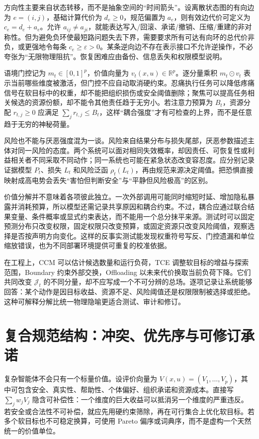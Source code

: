 方向性主要来自状态转移，而不是抽象空间的“时间箭头”。设离散状态图的有向边为 $e=(i,j)$，基础计算代价为 $d_e\geq0$，规范偏置为 $a_e$，则有效边代价可定义为 $c_e=d_e+a_e$。允许 $a_{ij}\neq a_{ji}$，就能表达写入/回滚、承诺/撤销、压缩/重建的非对称性。但为避免负环使最短路问题失去下界，需要要求所有可达有向环的总代价非负，或更强地令每条 $c_e\geq\varepsilon>0$。某条逆向边不存在表示接口不允许逆操作，不必夸张为“无限物理阻抗”。恢复困难应由备份、信息丢失和权限模型说明。

语境门控记为 $m_t\in[0,1]^p$，价值向量为 $v_t(x,u)\in\mathbb R^p$。逐分量乘积 $m_t\odot v_t$ 表示当前哪些维度被激活，但门控不应自动取消硬约束。忍痛执行任务可以降低疼痛信号在软目标中的权重，却不能把组织损伤或安全阈值删除；聚焦可以提高任务相关候选的资源份额，却不能令其他责任趋于无穷小。若注意力预算为 $B_t$，资源分配 $r_{t,j}\geq0$ 应满足 $\sum_jr_{t,j}\leq B_t$，这样“耦合强度”才有可检查的上界，而不是任意趋于无穷的神秘荷量。

风险也不能与厌恶强度混为一谈。风险来自结果分布与损失尾部，厌恶参数描述主体对同一风险的态度。两个系统可以面对相同失效概率，却因责任、可恢复性或利益相关者不同采取不同动作；同一系统也可能在紧急状态改变容忍度。应分别记录证据模型 $P_t$、损失 $L_t$ 和风险泛函 $\rho_t(L_t)$，再由规范来源决定阈值。把恐惧直接映射成高电势会丢失“害怕但判断安全”与“平静但风险极高”的区别。

价值分解并不意味着各项彼此独立。一次外部调用可能同时缩短时延、增加隐私暴露并消耗预算，所以模型还需记录共享原因和耦合约束。不过，耦合应通过联合结果变量、条件概率或显式约束表达，而不能用一个总分抹平来源。测试时可以固定预测分布只改变权限，固定权限只改变预算，或固定资源只改变风险阈值，观察选择是否按声明方向变化。这样的反事实测试能发现权重符号写反、门控遗漏和单位缩放错误，也为不同部署环境提供可重复的校准依据。

在工程上，CCM 可以估计候选数量和运行负荷，TCE 调整软目标的增益与探索范围，Boundary 约束外部交换，Offloading 以未来代价换取当前负荷下降。它们共同改变 $\mathcal J_t$ 的不同分量，却不应写成一个不可分辨的总场。逐项记录让系统能够回答：某个动作是因目标收益、资源不足、风险阈值还是权限限制被选择或拒绝。这种可解释分解比统一物理隐喻更适合测试、审计和修订。

\section{复合规范结构：冲突、优先序与可修订承诺}
\label{sec:semantic_structure_of_gauge}

复杂智能体不会只有一个标量价值。设评价向量为 $V(x,u)=(V_1,\ldots,V_p)$，其中可包含安全、真实性、帮助性、个体偏好、组织承诺和资源成本。直接写 $\sum_jw_jV_j$ 隐含可补偿性：一个维度的巨大收益可以抵消另一个维度的严重违反。若安全或合法性不可补偿，就应先用硬约束筛除，再在可行集合上优化软目标。若多个软目标也不可稳定换算，可使用 Pareto 偏序或词典序，而不是虚构一个天然统一的价值单位。

